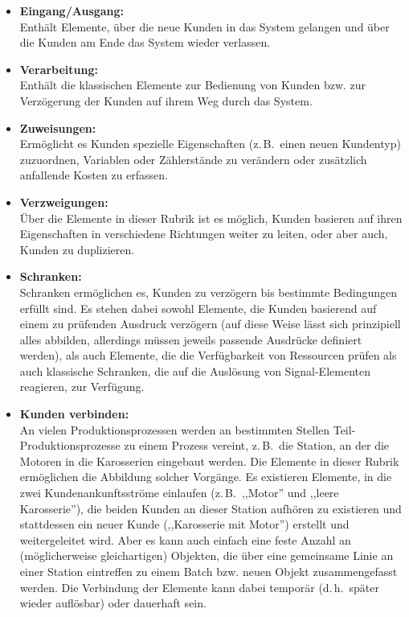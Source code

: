 \documentclass[deutsch]{svmono}
\begin{document}
\begin{itemize}
\item
\textbf{Eingang/Ausgang:}\\
Enthält Elemente, über die neue Kunden in das System gelangen und über die Kunden am Ende das System wieder verlassen.
\item
\textbf{Verarbeitung:}\\
Enthält die klassischen Elemente zur Bedienung von Kunden bzw. zur Verzögerung der Kunden auf ihrem Weg durch das System.
\item
\textbf{Zuweisungen:}\\
Ermöglicht es Kunden spezielle Eigenschaften (z.\,B.\ einen neuen Kundentyp) zuzuordnen, Variablen oder Zählerstände zu verändern oder zusätzlich anfallende Kosten zu erfassen.
\item
\textbf{Verzweigungen:}\\
Über die Elemente in dieser Rubrik ist es möglich, Kunden basieren auf ihren Eigenschaften in verschiedene Richtungen weiter zu leiten, oder aber auch, Kunden zu duplizieren.
\item
\textbf{Schranken:}\\
Schranken ermöglichen es, Kunden zu verzögern bis bestimmte Bedingungen erfüllt sind. Es stehen dabei sowohl Elemente, die Kunden basierend auf einem zu prüfenden Ausdruck verzögern (auf diese Weise lässt sich prinzipiell alles abbilden, allerdings müssen jeweils passende Ausdrücke definiert werden), als auch Elemente, die die Verfügbarkeit von Ressourcen prüfen als auch klassische Schranken, die auf die Auslösung von Signal-Elementen reagieren, zur Verfügung.
\item
\textbf{Kunden verbinden:}\\
An vielen Produktionsprozessen werden an bestimmten Stellen Teil-Produktionsprozesse zu einem Prozess vereint, z.\,B.\ die Station, an der die Motoren in die Karosserien eingebaut werden. Die Elemente in dieser Rubrik ermöglichen die Abbildung solcher Vorgänge. Es existieren Elemente, in die zwei Kundenankunftsströme einlaufen (z.\,B.\ ,,Motor'' und ,,leere Karosserie''), die beiden Kunden an dieser Station aufhören zu existieren und stattdessen ein neuer Kunde (,,Karosserie mit Motor'') erstellt und weitergeleitet wird. Aber es kann auch einfach eine feste Anzahl an (möglicherweise gleichartigen) Objekten, die über eine gemeinsame Linie an einer Station eintreffen zu einem Batch bzw. neuen Objekt zusammengefasst werden. Die Verbindung der Elemente kann dabei temporär (d.\,h.\ später wieder auflösbar) oder dauerhaft sein.

\end{itemize}
\end{document}
